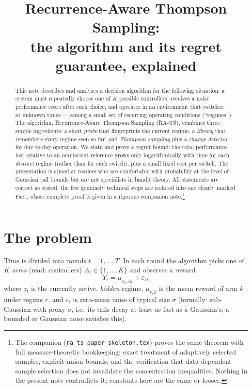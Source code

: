 \documentclass[11pt]{article}
\title{Recurrence-Aware Thompson Sampling:\\
\large the algorithm and its regret guarantee, explained}
\author{}
\date{}
\begin{document}
\maketitle

\begin{abstract}
This note describes and analyzes a decision algorithm for the following situation: a system must repeatedly choose one of $K$ possible controllers, receives a noisy performance score after each choice, and operates in an environment that switches --- at unknown times --- among a small set of recurring operating conditions (``regimes''). The algorithm, Recurrence-Aware Thompson Sampling (RA-TS), combines three simple ingredients: a short \emph{probe} that fingerprints the current regime, a \emph{library} that remembers every regime seen so far, and \emph{Thompson sampling} plus a \emph{change detector} for day-to-day operation. We state and prove a regret bound: the total performance lost relative to an omniscient reference grows only logarithmically with time for each \emph{distinct} regime (rather than for each switch), plus a small fixed cost per switch. The presentation is aimed at readers who are comfortable with probability at the level of Gaussian tail bounds but are not specialists in bandit theory. All statements are correct as stated; the few genuinely technical steps are isolated into one clearly marked Fact, whose complete proof is given in a rigorous companion note.\footnote{The companion (\texttt{ra\_ts\_paper\_skeleton.tex}) proves the same theorem with full measure-theoretic bookkeeping: exact treatment of adaptively selected samples, explicit union bounds, and the verification that data-dependent sample selection does not invalidate the concentration inequalities. Nothing in the present note contradicts it; constants here are the same or looser.}
\end{abstract}

\section{The problem}

Time is divided into rounds $t=1,\dots,T$. In each round the algorithm picks one of $K$ \emph{arms} (read: controllers) $A_t\in\{1,\dots,K\}$ and observes a reward
\begin{equation}
    Y_t=\mu_{z_t,A_t}+\varepsilon_t ,
    \label{eq:model}
\end{equation}
where $z_t$ is the currently active, \emph{hidden} regime, $\mu_{r,k}$ is the mean reward of arm $k$ under regime $r$, and $\varepsilon_t$ is zero-mean noise of typical size $\sigma$ (formally: sub-Gaussian with proxy $\sigma$, i.e.\ its tails decay at least as fast as a Gaussian's; a bounded or Gaussian noise satisfies this).
\end{document}
